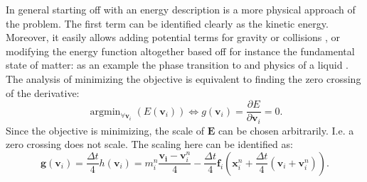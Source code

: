\documentclass[m,times]{cgMA}
\DeclareMathOperator*{\argmin}{arg min}
\begin{document}
In general starting off with an energy description is a more physical approach of the problem. The first term can be identified clearly as the kinetic energy. Moreover, it easily allows adding potential terms for gravity or collisions \cite{MPM:OPTIMI_INTEGR}, or modifying the energy function altogether based off for instance the fundamental state of matter: as an example the phase transition to and physics of a liquid \cite{MPM:PHASE_CHANGE}.
The analysis of minimizing the objective is equivalent to finding the zero crossing of the derivative:
\begin{equation}
  \argmin_{\forall \boldsymbol{v}_i}(E(\boldsymbol{v}_i)) \Leftrightarrow g(\boldsymbol{v}_i) = \frac{\partial E}{\partial \boldsymbol{v}_i} = 0.
\end{equation}
Since the objective is minimizing, the scale of $\boldsymbol{E}$ can be chosen arbitrarily. I.e. a zero crossing does not scale. The scaling here can be identified as:
\begin{equation}
  \boldsymbol{g}(\boldsymbol{v}_i) = \frac{\Delta t}{4} h(\boldsymbol{v}_i) = m_i^n \frac{\boldsymbol{v_i}-\boldsymbol{v}_i^n}{4} -\frac{\Delta t}{4} \boldsymbol{f}_i\left(\boldsymbol{x}_i^n + \frac{\Delta t}{4} (\boldsymbol{v}_i + \boldsymbol{v}_i^{n})\right).
\end{equation}
\begin{flushright}\cite{MPM:COURSE}\cite{MPM:APIC}\end{flushright}
\end{document}
